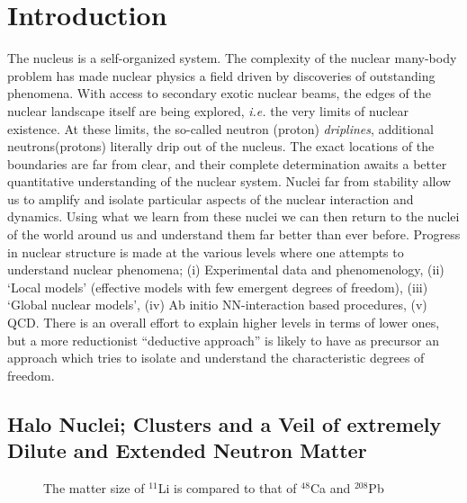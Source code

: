 \chapter{Introduction}
\thispagestyle{empty}

The nucleus is a self-organized system. The complexity of the
nuclear many-body problem has made nuclear physics a field driven
by discoveries of outstanding phenomena. With access to secondary
exotic nuclear beams, the edges of the nuclear landscape itself
are being explored, {\em i.e.} the very limits of nuclear
existence. At these limits, the so-called neutron (proton) {\em
driplines}, additional neutrons(protons) literally drip out of the
nucleus. The exact locations of the boundaries are far from clear,
and their complete determination awaits a better quantitative
understanding of the nuclear system. Nuclei far from stability
allow us to amplify and isolate particular aspects of the nuclear
interaction and dynamics. Using what we learn from these nuclei we
can then return to the nuclei of the world around us and
understand them far better than ever before. Progress in nuclear
structure is made at the various levels where one attempts to
understand nuclear phenomena; (i) Experimental data and
phenomenology, (ii) `Local models' (effective models with few
emergent degrees of freedom),
 (iii) `Global nuclear models',
(iv) Ab initio NN-interaction based procedures, (v) QCD.
There is an overall effort to explain higher levels in terms of
lower ones, but a more reductionist ``deductive approach'' is
likely to have as precursor an approach which tries to isolate and
understand the characteristic degrees of freedom. 

\section{Halo Nuclei; Clusters and a Veil of extremely Dilute and
Extended Neutron Matter}


\begin{figure}[tb]
\centerline{}
\vspace{3mm}
\caption{The matter size of $^{11}$Li is compared to
that of $^{48}$Ca and $^{208}$Pb \label{Size} }
\end{figure}

